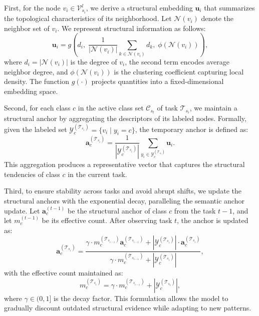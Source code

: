\documentclass[sigconf]{acmart}
\begin{document}
First, for the node $v_i \in \mathcal{V}^l_{s_i}$, we derive a structural embedding $\mathbf{u}_i$ that summarizes the topological characteristics of its neighborhood.
Let $\mathcal{N}(v_i)$ denote the neighbor set of $v_i$.
We represent structural information as follows:
\begin{equation}
\mathbf{u}_i = g\!\left(d_i, \; \frac{1}{|\mathcal{N}(v_i)|}\sum_{k \in \mathcal{N}(v_i)} d_k, \; \phi(\mathcal{N}(v_i)) \right),
\end{equation}
where $d_i = |\mathcal{N}(v_i)|$ is the degree of $v_i$, the second term encodes average neighbor degree, and $\phi(\mathcal{N}(v_i))$ is the clustering coefficient capturing local density. 
The function $g(\cdot)$ projects quantities into a fixed-dimensional embedding space.  

Second, for each class $c$ in the active class set $\mathcal{C}_{s_t}$ of task $\mathcal{T}_{s_i}$, we maintain a structural anchor by aggregating the descriptors of its labeled nodes. 
Formally, given the labeled set $\mathcal{Y}_c^{(\mathcal{T}_{s_i})} = \{ v_i \mid y_i = c \}$, the temporary anchor is defined as:
\begin{equation}
\mathbf{a}_c^{(\mathcal{T}_{s_i})} = \frac{1}{|\mathcal{Y}_c^{(\mathcal{T}_{s_i})}|} \sum_{y_i \in \mathcal{Y}_c^{(\mathcal{T}_{s_i})}} \mathbf{u}_i.
\end{equation}
This aggregation produces a representative vector that captures the structural tendencies of class $c$ in the current task.  

Third, to ensure stability across tasks and avoid abrupt shifts, we update the structural anchors with the exponential decay, paralleling the semantic anchor update. 
Let $\mathbf{a}_c^{(t-1)}$ be the structural anchor of class $c$ from the task $t-1$, and let $m_c^{(t-1)}$ be its effective count. After observing task $t$, the anchor is updated as:
\begin{equation}
\mathbf{a}_c^{(\mathcal{T}_{s_i})} = \frac{\gamma \cdot m_c^{(\mathcal{T}_{s_{i-1}})} \mathbf{a}_c^{(\mathcal{T}_{s_{i-1}})} + |\mathcal{Y}_c^{(\mathcal{T}_{s_i})}| \cdot \mathbf{a}_c^{(\mathcal{T}_{s_i})}}{\gamma \cdot m_c^{(\mathcal{T}_{s_{i-1}})} + |\mathcal{Y}_c^{(\mathcal{T}_{s_i})}|},
\end{equation}
with the effective count maintained as:
\begin{equation}
m_c^{(\mathcal{T}_{s_i})} = \gamma \cdot m_c^{(\mathcal{T}_{s_{i-1}})} + |\mathcal{Y}_c^{(\mathcal{T}_{s_i})}|,
\end{equation}
where $\gamma \in (0,1]$ is the decay factor. 
This formulation allows the model to gradually discount outdated structural evidence while adapting to new patterns.  
\end{document}
